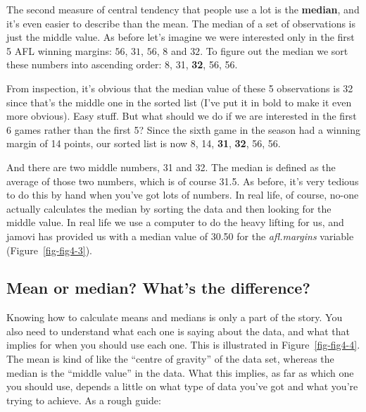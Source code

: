 \documentclass[
  a4paper,
]{book}
\begin{document}
The second measure of central tendency that people use a lot is the
\textbf{median}, and it's even easier to describe than the mean. The
median of a set of observations is just the middle value. As before
let's imagine we were interested only in the first 5 AFL winning
margins: \(56\), \(31\), \(56\), \(8\) and \(32\). To figure out the
median we sort these numbers into ascending order: 8, 31, \textbf{32},
56, 56.

From inspection, it's obvious that the median value of these 5
observations is 32 since that's the middle one in the sorted list (I've
put it in bold to make it even more obvious). Easy stuff. But what
should we do if we are interested in the first 6 games rather than the
first 5? Since the sixth game in the season had a winning margin of 14
points, our sorted list is now 8, 14, \textbf{31}, \textbf{32}, 56, 56.

And there are two middle numbers, 31 and 32. The median is defined as
the average of those two numbers, which is of course 31.5. As before,
it's very tedious to do this by hand when you've got lots of numbers. In
real life, of course, no-one actually calculates the median by sorting
the data and then looking for the middle value. In real life we use a
computer to do the heavy lifting for us, and jamovi has provided us with
a median value of 30.50 for the \emph{afl.margins} variable
(Figure~\ref{fig-fig4-3}).

\hypertarget{mean-or-median-whats-the-difference}{%
\subsection{Mean or median? What's the
difference?}\label{mean-or-median-whats-the-difference}}

Knowing how to calculate means and medians is only a part of the story.
You also need to understand what each one is saying about the data, and
what that implies for when you should use each one. This is illustrated
in Figure~\ref{fig-fig4-4}. The mean is kind of like the ``centre of
gravity'' of the data set, whereas the median is the ``middle value'' in
the data. What this implies, as far as which one you should use, depends
a little on what type of data you've got and what you're trying to
achieve. As a rough guide:
\end{document}
